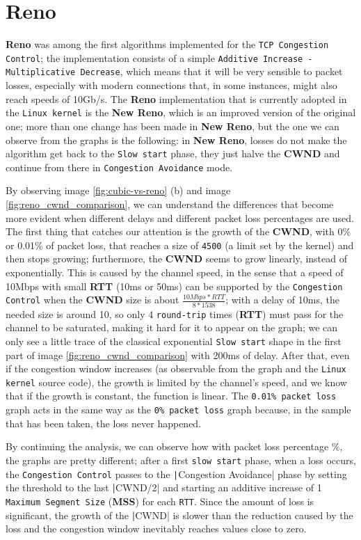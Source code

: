 \documentclass{exam}
\begin{document}
\section{Reno}
\textbf{Reno} was among the first algorithms implemented for the \texttt{TCP Congestion Control}; the implementation consists of a simple \texttt{Additive Increase - Multiplicative Decrease}, which means that it will be very sensible to packet losses, especially with modern connections that, in some instances, might also reach speeds of 10Gb/s. The \textbf{Reno} implementation that is currently adopted in the \texttt{Linux kernel} is the \textbf{New Reno}, which is an improved version of the original one; more than one change has been made in \textbf{New Reno}, but the one we can observe from the graphs is the following: in \textbf{New Reno}, losses do not make the algorithm get back to the \texttt{Slow start} phase, they just halve the \textbf{CWND} and continue from there in \texttt{Congestion Avoidance} mode.

By observing image \ref{fig:cubic-vs-reno} (b) and image \ref{fig:reno_cwnd_comparison}, we can understand the differences that become more evident when different delays and different packet loss percentages are used. 
The first thing that catches our attention is the growth of the \textbf{CWND}, with 0\% or 0.01\% of packet loss, that reaches a size of \texttt{4500} (a limit set by the kernel) and then stops growing; furthermore, the \textbf{CWND} seems to grow linearly, instead of exponentially. This is caused by the channel speed, in the sense that a speed of 10Mbps with small \textbf{RTT} (10ms or 50ms) can be supported by the \texttt{Congestion Control} when the \textbf{CWND} size is about $ \frac{10Mbps * RTT}{8 * 1538}$; with a delay of 10ms, the needed size is around 10, so only 4 \texttt{round-trip} times (\textbf{RTT}) must pass for the channel to be saturated, making it hard for it to appear on the graph; we can only see a little trace of the classical exponential \texttt{Slow start} shape in the first part of image \ref{fig:reno_cwnd_comparison} with 200ms of delay. After that, even if the congestion window increases (as observable from the graph and the \texttt{Linux kernel} source code), the growth is limited by the channel's speed, and we know that if the growth is constant, the function is linear. The \texttt{0.01\% packet loss} graph acts in the same way as the \texttt{0\% packet loss} graph because, in the sample that has been taken, the loss never happened.

By continuing the analysis, we can observe how with packet loss percentage \%, the graphs are pretty different; after a first \texttt{slow start} phase, when a loss occurs, the \texttt{Congestion Control} passes to the \texttt|Congestion Avoidance| phase by setting the threshold to the last \textbf|CWND/2| and starting an additive increase of 1 \texttt{Maximum Segment Size} (\textbf{MSS}) for each \texttt{RTT}. Since the amount of loss is significant, the growth of the \textbf|CWND| is slower than the reduction caused by the loss and the congestion window inevitably reaches values close to zero.
\end{document}
